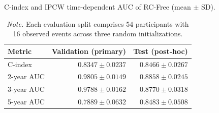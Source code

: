 \begin{table}[H]
\centering\small
\caption{C-index and IPCW time-dependent AUC of RC-Free (mean $\pm$ SD).}
\label{tab:survival-metrics}
\begin{tabularx}{\linewidth}{@{}Y r r@{}}
\toprule
\textbf{Metric} & \textbf{Validation (primary)} & \textbf{Test (post-hoc)} \\
\midrule
C-index & $\mathbf{0.8347\pm0.0237}$ & $\mathbf{0.8466\pm0.0267}$ \\
2-year AUC & $\mathbf{0.9805\pm0.0149}$ & $0.8858\pm0.0245$ \\
3-year AUC & $\mathbf{0.9788\pm0.0162}$ & $0.8770\pm0.0318$ \\
5-year AUC & $0.7889\pm0.0632$ & $0.8483\pm0.0508$ \\
\bottomrule
\end{tabularx}
\caption*{\textit{Note.} Each evaluation split comprises 54 participants with 16 observed events across three random initializations.}
\end{table}
